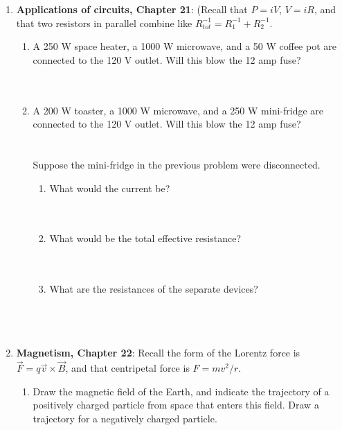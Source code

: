 \documentclass[10pt]{article}
\begin{document}
\maketitle

\begin{enumerate}
\item \textbf{Applications of circuits, Chapter 21}: (Recall that $P = iV$, $V = iR$, and that two resistors in parallel combine like $R_{tot}^{-1} = R_{1}^{-1} + R_{2}^{-1}$.
\begin{enumerate}
\item A 250 W space heater, a 1000 W microwave, and a 50 W coffee pot are connected to the 120 V outlet.  Will this blow the 12 amp fuse? \\ \\ \\
\item A 200 W toaster, a 1000 W microwave, and a 250 W mini-fridge are connected to the 120 V outlet.  Will this blow the 12 amp fuse? \\ \\ \\
Suppose the mini-fridge in the previous problem were disconnected.
\begin{enumerate}
\item What would the current be? \\ \\ \\
\item What would be the total effective resistance? \\ \\ \\
\item What are the resistances of the separate devices? \\ \\ \\ \\
\end{enumerate}
\end{enumerate}
\item \textbf{Magnetism, Chapter 22}: Recall the form of the Lorentz force is $\vec{F} = q\vec{v} \times \vec{B}$, and that centripetal force is $F = mv^2/r$.
\begin{enumerate}
\item Draw the magnetic field of the Earth, and indicate the trajectory of a positively charged particle from space that enters this field.  Draw a trajectory for a negatively charged particle. \\ \vspace{4cm}

\end{enumerate}
\end{enumerate}
\end{document}
